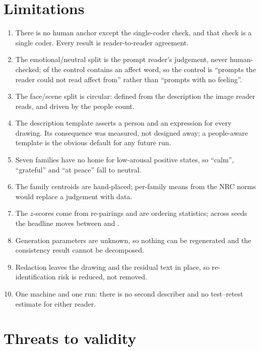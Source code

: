 \section{Limitations}
\label{sec:disc-limitations}

\begin{enumerate}\setlength{\itemsep}{2pt}
\item There is no human anchor except the single-coder check, and that check is a single coder. Every result is reader-to-reader agreement.
\item The emotional/neutral split is the prompt reader's judgement, never human-checked; \CtrlFlaggedPct{} of the control contains an affect word, so the control is ``prompts the reader could not read affect from'' rather than ``prompts with no feeling''.
\item The face/scene split is circular: defined from the description the image reader reads, and driven by the people count.
\item The description template asserts a person and an expression for every drawing. Its consequence was measured, not designed away; a people-aware template is the obvious default for any future run.
\item Seven families have no home for low-arousal positive states, so ``calm'', ``grateful'' and ``at peace'' fall to neutral.
\item The family centroids are hand-placed; per-family means from the NRC norms \cite{mohammad2018obtaining} would replace a judgement with data.
\item The $z$-scores come from \nullShuffles{} re-pairings and are ordering statistics; across seeds the headline moves between \ZSeedMin{} and \ZSeedMax{}.
\item Generation parameters are unknown, so nothing can be regenerated and the consistency result cannot be decomposed.
\item Redaction leaves the drawing and the residual text in place, so re-identification risk is reduced, not removed.
\item One machine and one run: there is no second describer and no test--retest estimate for either reader.
\end{enumerate}

\section{Threats to validity}
\label{sec:disc-threats}

